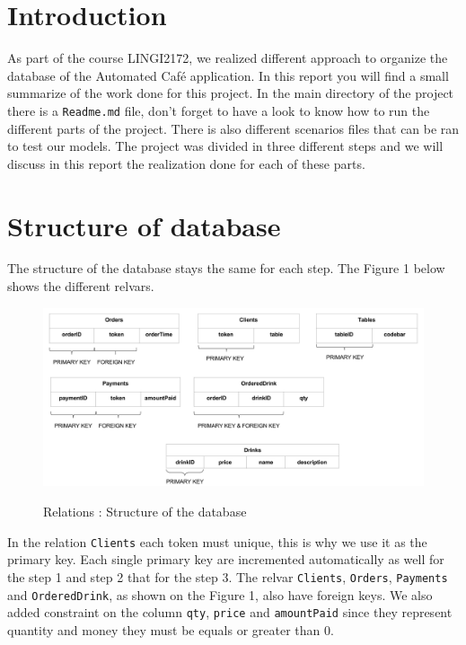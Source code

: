 \documentclass[a4paper,10pt]{article}
\begin{document}
\section*{Introduction}

As part of the course LINGI2172, we realized different approach to organize the database of the Automated Café application. In this report you will find a small summarize of the work done for this project. In the main directory of the project there is a \texttt{Readme.md} file, don't forget to have a look to know how to run the different parts of the project. There is also different scenarios files that can be ran to test our models. The project was divided in three different steps and we will discuss in this report the realization done for each of these parts.

\section*{Structure of database}

The structure of the database stays the same for each step. The Figure 1 below shows the different relvars. \\

\begin{figure}[h!]
      \begin{center}
       \includegraphics[scale=0.4]{relations.png}
       \label{rel}
       \caption{Relations : Structure of the database}
      \end{center}
\end{figure}

In the relation \texttt{Clients} each token must unique, this is why we use it as the primary key. Each single primary key are incremented automatically as well for the step 1 and step 2 that for the step 3. The relvar \texttt{Clients}, \texttt{Orders}, \texttt{Payments} and \texttt{OrderedDrink}, as shown on the Figure 1, also have foreign keys. We also added constraint on the column \texttt{qty}, \texttt{price} and \texttt{amountPaid} since they represent quantity and money they must be equals or greater than 0.
\end{document}
